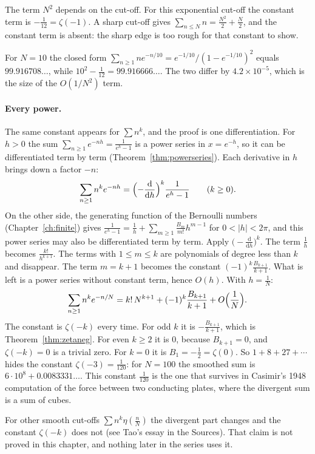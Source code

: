 The term $N^2$ depends on the cut-off. For this exponential cut-off the constant term is $-\frac1{12}=\zeta(-1)$. A sharp cut-off gives $\sum_{n\le N}n=\frac{N^2}2+\frac N2$, and the constant term is absent: the sharp edge is too rough for that constant to show.

For $N=10$ the closed form $\sum_{n\ge1}ne^{-n/10}=e^{-1/10}/(1-e^{-1/10})^2$ equals $99.916708\ldots$, while $10^2-\frac1{12}=99.916666\ldots$. The two differ by $4.2\times10^{-5}$, which is the size of the $O(1/N^2)$ term.

\paragraph{Every power.} The same constant appears for $\sum n^k$, and the proof is one differentiation. For $h>0$ the sum $\sum_{n\ge1}e^{-nh}=\frac1{e^h-1}$ is a power series in $x=e^{-h}$, so it can be differentiated term by term (Theorem~\ref{thm:powerseries}). Each derivative in $h$ brings down a factor $-n$:
\[
\sum_{n\ge1}n^ke^{-nh}=\Bigl(-\frac{\mathrm d}{\mathrm dh}\Bigr)^k\frac1{e^h-1}\qquad(k\ge0).
\]
On the other side, the generating function of the Bernoulli numbers (Chapter~\ref{ch:finite}) gives $\frac1{e^h-1}=\frac1h+\sum_{m\ge1}\frac{B_m}{m!}h^{m-1}$ for $0<|h|<2\pi$, and this power series may also be differentiated term by term. Apply $\bigl(-\frac{\mathrm d}{\mathrm dh}\bigr)^k$. The term $\frac1h$ becomes $\frac{k!}{h^{k+1}}$. The terms with $1\le m\le k$ are polynomials of degree less than $k$ and disappear. The term $m=k+1$ becomes the constant $(-1)^k\frac{B_{k+1}}{k+1}$. What is left is a power series without constant term, hence $O(h)$. With $h=\frac1N$:
\[
\sum_{n\ge1}n^ke^{-n/N}=k!\,N^{k+1}+(-1)^k\frac{B_{k+1}}{k+1}+O\Bigl(\frac1N\Bigr).
\]
The constant is $\zeta(-k)$ every time. For odd $k$ it is $-\frac{B_{k+1}}{k+1}$, which is Theorem~\ref{thm:zetaneg}. For even $k\ge2$ it is $0$, because $B_{k+1}=0$, and $\zeta(-k)=0$ is a trivial zero. For $k=0$ it is $B_1=-\frac12=\zeta(0)$. So $1+8+27+\cdots$ hides the constant $\zeta(-3)=\frac1{120}$: for $N=100$ the smoothed sum is $6\cdot10^8+0.0083331\ldots$. This constant $\frac1{120}$ is the one that survives in Casimir's 1948 computation of the force between two conducting plates, where the divergent sum is a sum of cubes.

For other smooth cut-offs $\sum n^k\eta(\frac nN)$ the divergent part changes and the constant $\zeta(-k)$ does not (see Tao's essay in the Sources). That claim is not proved in this chapter, and nothing later in the series uses it.

